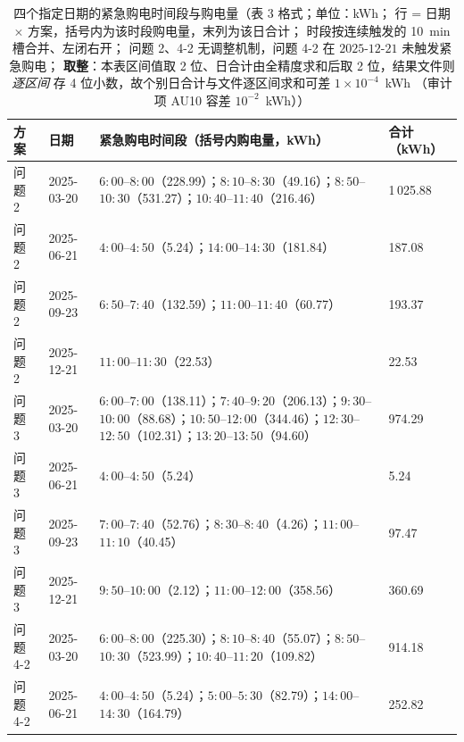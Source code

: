 \begin{table}[htbp]
  \centering
  \caption{四个指定日期的紧急购电时间段与购电量（表 3 格式；单位：kWh；
           行 = 日期 \(\times\) 方案，括号内为该时段购电量，末列为该日合计；
           时段按连续触发的 10~min 槽合并、左闭右开；
           问题 2、4-2 无调整机制，问题 4-2 在 \(2025\text{-}12\text{-}21\) 未触发紧急购电；
           \textbf{取整}：本表区间值取 2 位、日合计由全精度求和后取 2 位，结果文件则\emph{逐区间}
           存 4 位小数，故个别日合计与文件逐区间求和可差 \(1\times10^{-4}\)~kWh
           （审计项 AU10 容差 \(10^{-2}\)~kWh））}
  \label{tab:emergency}
  \footnotesize
  \setlength{\tabcolsep}{4pt}
  \begin{tabular}{C{1.35cm} C{1.85cm} L{8.10cm} C{1.85cm}}
    \toprule
    方案 & 日期 & 紧急购电时间段（括号内购电量，kWh） & 合计（kWh） \\
    \midrule
    问题 2 & 2025-03-20 & \(6{:}00\)--\(8{:}00\)（228.99）；\(8{:}10\)--\(8{:}30\)（49.16）；\(8{:}50\)--\(10{:}30\)（531.27）；\(10{:}40\)--\(11{:}40\)（216.46） & 1\,025.88 \\
    问题 2 & 2025-06-21 & \(4{:}00\)--\(4{:}50\)（5.24）；\(14{:}00\)--\(14{:}30\)（181.84） & 187.08 \\
    问题 2 & 2025-09-23 & \(6{:}50\)--\(7{:}40\)（132.59）；\(11{:}00\)--\(11{:}40\)（60.77） & 193.37 \\
    问题 2 & 2025-12-21 & \(11{:}00\)--\(11{:}30\)（22.53） & 22.53 \\
    \midrule
    问题 3 & 2025-03-20 & \(6{:}00\)--\(7{:}00\)（138.11）；\(7{:}40\)--\(9{:}20\)（206.13）；\(9{:}30\)--\(10{:}00\)（88.68）；\(10{:}50\)--\(12{:}00\)（344.46）；\(12{:}30\)--\(12{:}50\)（102.31）；\(13{:}20\)--\(13{:}50\)（94.60） & 974.29 \\
    问题 3 & 2025-06-21 & \(4{:}00\)--\(4{:}50\)（5.24） & 5.24 \\
    问题 3 & 2025-09-23 & \(7{:}00\)--\(7{:}40\)（52.76）；\(8{:}30\)--\(8{:}40\)（4.26）；\(11{:}00\)--\(11{:}10\)（40.45） & 97.47 \\
    问题 3 & 2025-12-21 & \(9{:}50\)--\(10{:}00\)（2.12）；\(11{:}00\)--\(12{:}00\)（358.56） & 360.69 \\
    \midrule
    问题 4-2 & 2025-03-20 & \(6{:}00\)--\(8{:}00\)（225.30）；\(8{:}10\)--\(8{:}40\)（55.07）；\(8{:}50\)--\(10{:}30\)（523.99）；\(10{:}40\)--\(11{:}20\)（109.82） & 914.18 \\
    问题 4-2 & 2025-06-21 & \(4{:}00\)--\(4{:}50\)（5.24）；\(5{:}00\)--\(5{:}30\)（82.79）；\(14{:}00\)--\(14{:}30\)（164.79） & 252.82 \\

\end{tabular}
\end{table}
